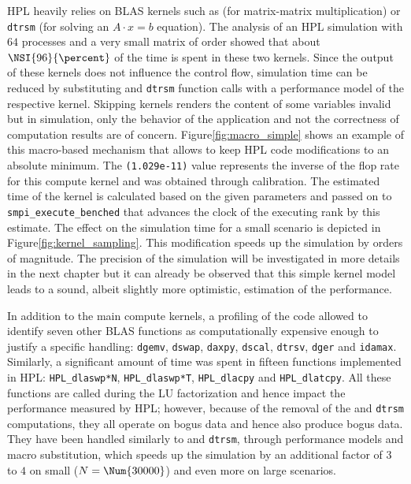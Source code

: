             HPL heavily relies on BLAS kernels such as \dgemm (for matrix-matrix multiplication) or \texttt{dtrsm}
            (for solving an  \(A\cdot x=b\) equation). The analysis of an HPL simulation with \(64\) processes and a very
            small matrix of order  showed that about \(\NSI{96}{\percent}\) of the time is spent in these two
            kernels. Since the output of these kernels does not influence the control flow, simulation time can be reduced
            by substituting \dgemm and \texttt{dtrsm} function calls with a performance model of the respective
            kernel.
            Skipping kernels renders the content of some variables invalid but in simulation, only the behavior of the
            application and not the correctness of computation results are of concern.  Figure\ref{fig:macro_simple} shows
            an example of this macro-based mechanism that allows to keep HPL code modifications to an absolute minimum. The
            \texttt{(1.029e-11)} value represents the inverse of the flop rate for this compute kernel and was obtained
            through calibration. The estimated time of the kernel is calculated based on the given parameters and passed on
            to \texttt{smpi\_execute\_benched} that advances the clock of the executing rank by this estimate.  The effect
            on the simulation time for a small scenario is depicted in Figure\ref{fig:kernel_sampling}. This modification
            speeds up the simulation by orders of magnitude. The precision of the simulation will be investigated in more
            details in the next chapter but it can already be observed that this simple kernel model leads to a sound,
            albeit slightly more optimistic, estimation of the performance.

            In addition to the main compute kernels, a profiling of the code allowed to identify seven other BLAS functions
            as computationally expensive enough to justify a specific handling: \texttt{dgemv}, \texttt{dswap},
            \texttt{daxpy}, \texttt{dscal}, \texttt{dtrsv}, \texttt{dger} and \texttt{idamax}. Similarly, a significant
            amount of time was spent in fifteen functions implemented in HPL: \texttt{HPL\_dlaswp*N},
            \texttt{HPL\_dlaswp*T}, \texttt{HPL\_dlacpy} and \texttt{HPL\_dlatcpy}.  All these functions are called during
            the LU factorization and hence impact the performance measured by HPL; however, because of the removal of the
            \dgemm and \texttt{dtrsm} computations, they all operate on bogus data and hence also produce bogus
            data. They have been handled similarly to \dgemm and \texttt{dtrsm}, through performance models and
            macro substitution, which speeds up the simulation by an additional factor of \(3\) to \(4\) on small
            (\(N=\Num{30000}\)) and even more on large scenarios.

